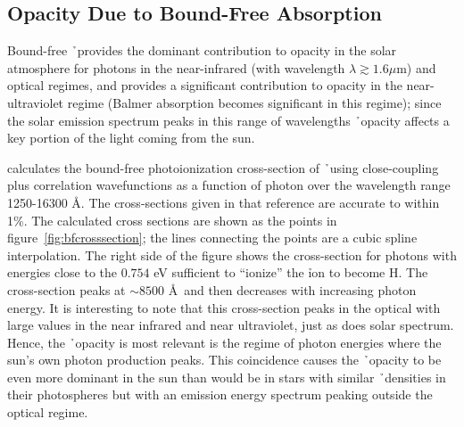\subsection{Opacity Due to Bound-Free Absorption}
Bound-free \h\ provides the dominant contribution to opacity in the
solar atmosphere for photons in the near-infrared (with wavelength $\lambda
\gtrsim 1.6 \mu$m) and optical regimes, and provides a significant
contribution to opacity in the near-ultraviolet regime (Balmer
absorption becomes significant in this regime); since the solar
emission spectrum peaks in this range of wavelengths \h\ opacity
affects a key portion of the light coming from the sun.

\cite{wishart1979} calculates the bound-free photoionization
cross-section of \h\ using close-coupling plus correlation
wavefunctions as a function of photon
over the wavelength range 1250-16300 \AA.  The cross-sections given
in that reference are accurate to within 1\%.
The calculated cross sections are shown as the points in
figure~\ref{fig:bfcrosssection}; the lines connecting the points are a
cubic spline interpolation.  The right side of the figure shows the
cross-section for photons with energies close to the $0.754$ eV
sufficient to ``ionize'' the \h ion to become H.  The cross-section
peaks at $\sim 8500$ \AA\ and then decreases with increasing photon
energy.  It is interesting to note that this cross-section peaks in
the optical with large values in the near infrared and near
ultraviolet, just as does solar spectrum.  Hence, the \h\ opacity is
most relevant is the regime of photon energies where the sun's own
photon production peaks.  This coincidence causes the \h\ opacity to
be even more dominant in the sun than would be in stars with similar \h\
densities in their photospheres but with an emission energy spectrum
peaking outside the optical regime.
